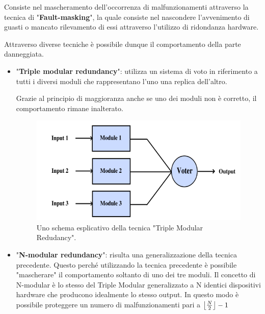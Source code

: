 \documentclass[LaM,binding=0.6cm,oneside]{../sapthesis}
\DeclarePairedDelimiter\floor{\lfloor}{\rfloor}
\begin{document}
Consiste nel mascheramento dell'occorrenza di malfunzionamenti attraverso la tecnica di "\textbf{Fault-masking}", la quale consiste nel nascondere l'avvenimento di guasti o mancato rilevamento di essi attraverso l'utilizzo di ridondanza hardware. 

Attraverso diverse tecniche è possibile dunque il comportamento della parte danneggiata.

\begin{itemize}
    \item "\textbf{Triple modular redundancy}": utilizza un sistema di voto in riferimento a tutti i diversi moduli che rappresentano l'uno una replica dell'altro. 
    
    Grazie al principio di maggioranza anche se uno dei moduli non è corretto, il comportamento rimane inalterato.
    
    \begin{figure}[htbp]
    \centerline{\includegraphics[scale=.67]{examples/TripleRedudancy.PNG}}
    \caption{Uno schema esplicativo della tecnica "Triple Modular Redudancy".}
    \label{fig}
    \end{figure}
\newline
    
    \item "\textbf{N-modular redundancy}": risulta una generalizzazione della tecnica precedente. Questo perché utilizzando la tecnica precedente è possibile "mascherare" il comportamento soltanto di uno dei tre moduli. Il concetto di N-modular è lo stesso del Triple Modular generalizzato a N identici dispositivi hardware che producono idealmente lo stesso output. In questo modo è possibile proteggere un numero di malfunzionamenti pari a $\floor*{\frac{N}{2}}-1$
    

\end{itemize}
\end{document}
